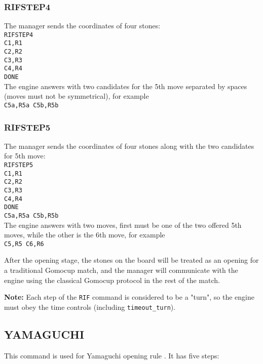 \documentclass[12pt,a4paper]{article}
\begin{document}
\subsubsection{RIFSTEP4}
The manager sends the coordinates of four stones:\\
\texttt{RIFSTEP4}\\
\texttt{C1,R1}\\
\texttt{C2,R2}\\
\texttt{C3,R3}\\
\texttt{C4,R4}\\
\texttt{DONE}\\
The engine answers with two candidates for the 5th move separated by spaces (moves must not be symmetrical), for example\\
\texttt{C5a,R5a C5b,R5b}

\subsubsection{RIFSTEP5}
The manager sends the coordinates of four stones along with the two candidates for 5th move:\\
\texttt{RIFSTEP5}\\
\texttt{C1,R1}\\
\texttt{C2,R2}\\
\texttt{C3,R3}\\
\texttt{C4,R4}\\
\texttt{DONE}\\
\texttt{C5a,R5a C5b,R5b}\\
The engine answers with two moves, first must be one of the two offered 5th moves, while the other is the 6th move, for example\\
\texttt{C5,R5 C6,R6}

After the opening stage, the stones on the board will be treated as an opening for a traditional Gomocup match, and the manager will communicate with the engine using the classical Gomocup protocol in the rest of the match.

\textbf{Note:} Each step of the \texttt{RIF} command is considered to be a "turn", so the engine must obey the time controls (including \texttt{timeout{\_}turn}).


\subsection{YAMAGUCHI}
\label{cmd_yamaguchi}
This command is used for Yamaguchi opening rule \cite{renju_opening_rules}. It has five steps:
\end{document}
